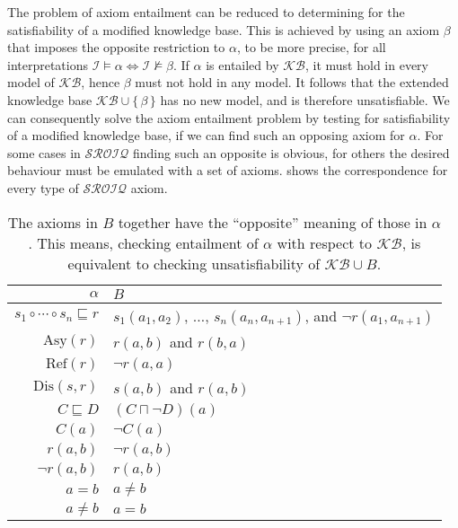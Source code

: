 The problem of axiom entailment can be reduced to determining for the satisfiability of a modified knowledge base. This is achieved by using an axiom $\beta$ that imposes the opposite restriction to $\alpha$, to be more precise, for all interpretations $\mathcal{I} \vDash \alpha \iff \mathcal{I} \not\vDash \beta$. If $\alpha$ is entailed by $\mathcal{KB}$, it must hold in every model of $\mathcal{KB}$, hence $\beta$ must not hold in any model. It follows that the extended knowledge base $\mathcal{KB} \cup \{ \, \beta \, \}$ has no new model, and is therefore unsatisfiable. We can consequently solve the axiom entailment problem by testing for satisfiability of a modified knowledge base, if we can find such an opposing axiom for $\alpha$. For some cases in $\mathcal{SROIQ}$ finding such an opposite is obvious, for others the desired behaviour must be emulated with a set of axioms.  shows the correspondence for every type of $\mathcal{SROIQ}$ axiom.

\begin{table}[h!]
    \centering
    \begin{tabular}{| r | l |} 
        \hline
        $\alpha$ & $B$ \\
        \hline
        $s_1 \circ \cdots \circ s_n \sqsubseteq r$ & $s_1(a_1, a_2)$, $\dots$, $s_n(a_n, a_{n + 1})$, and $\lnot r(a_1, a_{n + 1})$ \\ 
        $\mathrm{Asy}(r)$ & $r(a, b)$ and $r(b, a)$ \\
        $\mathrm{Ref}(r)$ & $\lnot r(a, a)$ \\
        $\mathrm{Dis}(s, r)$ & $s(a, b)$ and $r(a, b)$ \\
        $C \sqsubseteq D$ & $(C \sqcap \lnot D)(a)$ \\
        $C (a)$ & $\lnot C (a)$ \\
        $r (a, b)$ & $\lnot r(a, b)$ \\
        $\lnot r (a, b)$ & $r (a, b)$ \\
        $a = b$ & $a \not= b$ \\
        $a \not= b$ & $a = b$ \\
        \hline
    \end{tabular}
    \caption{The axioms in $B$ together have the “opposite” meaning of those in $\alpha$. This means, checking entailment of $\alpha$ with respect to $\mathcal{KB}$, is equivalent to checking unsatisfiability of $\mathcal{KB} \cup B$.}
    \label{table:entailment-correspondence}
\end{table}

